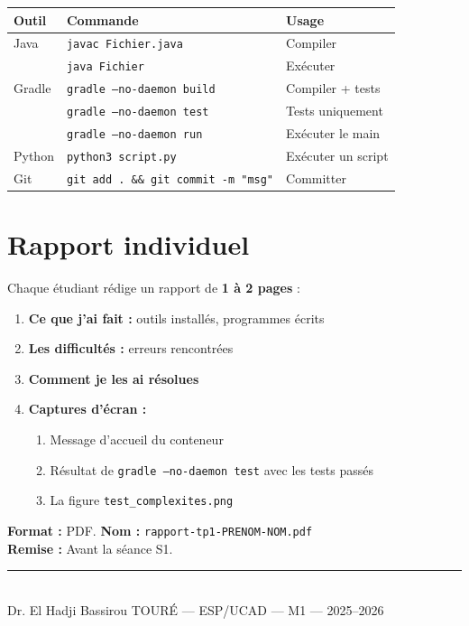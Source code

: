 \documentclass[11pt,a4paper]{article}
\begin{document}
\begin{retenirbox}
\renewcommand{\arraystretch}{1.3}
\begin{tabular}{@{}l l l@{}}
\toprule
\textbf{Outil} & \textbf{Commande} & \textbf{Usage} \\
\midrule
Java & \texttt{javac Fichier.java} & Compiler \\
     & \texttt{java Fichier} & Exécuter \\
Gradle & \texttt{gradle --no-daemon build} & Compiler + tests \\
       & \texttt{gradle --no-daemon test} & Tests uniquement \\
       & \texttt{gradle --no-daemon run} & Exécuter le main \\
Python & \texttt{python3 script.py} & Exécuter un script \\
Git & \texttt{git add . \&\& git commit -m "msg"} & Committer \\
\bottomrule
\end{tabular}
\end{retenirbox}

\section*{Rapport individuel}

\begin{attentionbox}
Chaque étudiant rédige un rapport de \textbf{1 à 2 pages} :
\begin{enumerate}[nosep]
    \item \textbf{Ce que j'ai fait :} outils installés, programmes écrits
    \item \textbf{Les difficultés :} erreurs rencontrées
    \item \textbf{Comment je les ai résolues}
    \item \textbf{Captures d'écran :}
    \begin{enumerate}[nosep, label=(\alph*)]
        \item Message d'accueil du conteneur
        \item Résultat de \texttt{gradle --no-daemon test} avec les tests passés
        \item La figure \texttt{test\_complexites.png}
    \end{enumerate}
\end{enumerate}
\textbf{Format :} PDF. \textbf{Nom :} \texttt{rapport-tp1-PRENOM-NOM.pdf}\\
\textbf{Remise :} Avant la séance S1.
\end{attentionbox}

\vfill
\begin{center}
\rule{0.6\textwidth}{0.4pt}\\[6pt]
{\small Dr. El Hadji Bassirou TOURÉ --- ESP/UCAD --- M1 --- 2025--2026}
\end{center}
\end{document}

